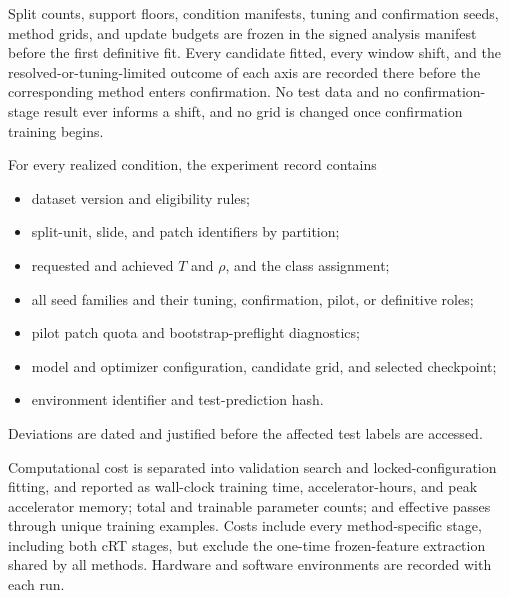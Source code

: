 \documentclass[11pt]{article}
\begin{document}
Split counts, support floors, condition manifests, tuning and confirmation seeds, method grids, and update budgets are frozen in the signed analysis manifest before the first definitive fit. Every candidate fitted, every window shift, and the resolved-or-tuning-limited outcome of each axis are recorded there before the corresponding method enters confirmation. No test data and no confirmation-stage result ever informs a shift, and no grid is changed once confirmation training begins.

For every realized condition, the experiment record contains
\begin{itemize}\setlength{\itemsep}{1pt}
  \item dataset version and eligibility rules;
  \item split-unit, slide, and patch identifiers by partition;
  \item requested and achieved $T$ and $\rho$, and the class assignment;
  \item all seed families and their tuning, confirmation, pilot, or definitive roles;
  \item pilot patch quota and bootstrap-preflight diagnostics;
  \item model and optimizer configuration, candidate grid, and selected checkpoint;
  \item environment identifier and test-prediction hash.
\end{itemize}
\noindent Deviations are dated and justified before the affected test labels are accessed.

Computational cost is separated into validation search and locked-configuration fitting, and reported as wall-clock training time, accelerator-hours, and peak accelerator memory; total and trainable parameter counts; and effective passes through unique training examples. Costs include every method-specific stage, including both cRT stages, but exclude the one-time frozen-feature extraction shared by all methods. Hardware and software environments are recorded with each run.
\end{document}
